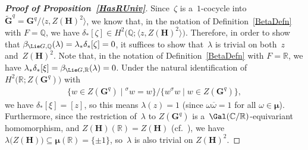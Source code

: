 \begin{proof}[\bf Proof of Proposition~\ref{HasRUniv}]
Since~$\zeta$ is a~$1$-cocycle into $\widetilde{\mathbf{G}}^q = \mathbf{G}^q/\langle z, Z(\mathbf{H})^2 \rangle$, we know
that, in the notation of Def\/inition~\ref{BetaDefn} with $F = \mathbb{Q}$, we have $\delta_*[\zeta] \in H^2\bigl(\mathbb{Q};
\langle z, Z(\mathbf{H})^2 \rangle\bigr)$.
Therefore, in order to show that $\beta_{\Lie G, \mathbb{Q}}(\lambda) = \lambda_* \delta_*[\zeta] = 0$, it suf\/f\/ices to
show that~$\lambda$ is trivial on both~$z$ and~$Z(\mathbf{H})^2$.
Note that, in the notation of Def\/inition~\ref{BetaDefn} with $F = \mathbb{R}$, we have $\lambda_* \delta_*[\xi] = \beta_{\Lie G,
\mathbb{R}}(\lambda) = 0$.
Under the natural identif\/ication of $H^2 \bigl(\mathbb{R}; Z(\mathbf{G}^q) \bigr)$ with
\begin{gather*}
\{ w \in Z(\mathbf{G}^q) \mid {}^\sigma w = w \} / \{ w {}^\sigma w \mid w \in Z(\mathbf{G}^q) \},
\end{gather*}
we have $\delta_* [\xi] = [z]$, so this means $\lambda(z) = 1$ (since $\omega \overline{\omega} = 1$ for all $\omega \in
\boldsymbol\mu$).
Furthermore, since the restriction of~$\lambda$ to $Z(\mathbf{G}^q)$ is a~$\Gal(\mathbb{C}/\mathbb{R})$-equivariant
homomorphism, and $Z(\mathbf{H})(\mathbb{R}) = Z(\mathbf{H})$ (cf.~\cite[p.~332]{PlatonovRapinchukBook}), we have
$\lambda \bigl(Z(\mathbf{H}) \bigr) \subseteq \boldsymbol\mu(\mathbb{R}) = \{\pm1\}$, so~$\lambda$ is also trivial on
$Z(\mathbf{H})^2$.
\end{proof}
